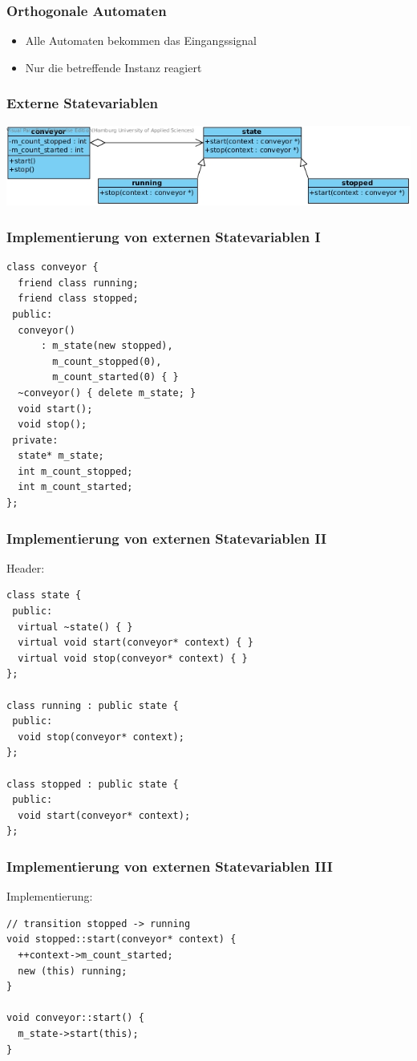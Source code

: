 \documentclass{beamer}
\begin{document}
\begin{frame}
 \frametitle{Orthogonale Automaten}
 \begin{itemize}
  \item Alle Automaten bekommen das Eingangssignal
  \item Nur die betreffende Instanz reagiert
 \end{itemize}
\end{frame}


\begin{frame}
 \frametitle{Externe Statevariablen}
 \includegraphics[scale=.44]{img/fsm_externe_state_var.jpg}
\end{frame}

\begin{frame}[fragile]
 \frametitle{Implementierung von externen Statevariablen I}
 \begin{lstlisting}
class conveyor {
  friend class running;
  friend class stopped;
 public:
  conveyor()
      : m_state(new stopped),
        m_count_stopped(0),
        m_count_started(0) { }
  ~conveyor() { delete m_state; }
  void start();
  void stop();
 private:
  state* m_state;
  int m_count_stopped;
  int m_count_started;
};
\end{lstlisting}
\end{frame}

\begin{frame}[fragile]
 \frametitle{Implementierung von externen Statevariablen II}
 Header:
 \begin{lstlisting}
class state {
 public:
  virtual ~state() { }
  virtual void start(conveyor* context) { }
  virtual void stop(conveyor* context) { }
};

class running : public state {
 public:
  void stop(conveyor* context);
};

class stopped : public state {
 public:
  void start(conveyor* context);
};
 \end{lstlisting}
\end{frame}

\begin{frame}[fragile]
 \frametitle{Implementierung von externen Statevariablen III}
 Implementierung:
 \begin{lstlisting}
// transition stopped -> running
void stopped::start(conveyor* context) {
  ++context->m_count_started;
  new (this) running;
}

void conveyor::start() {
  m_state->start(this);
}
 \end{lstlisting}
\end{frame}
\end{document}
